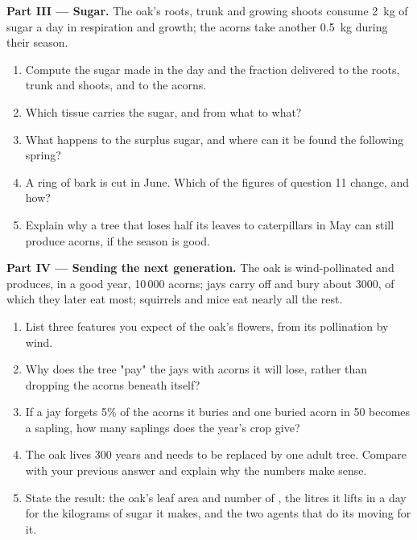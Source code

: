 \begin{problem}
\medskip
\noindent\textbf{Part III --- Sugar.}
The oak's roots, trunk and growing shoots consume \qty{2}{kg} of sugar
a day in respiration and growth; the acorns take another \qty{0.5}{kg}
during their season.
\begin{enumerate}[resume]
  \item Compute the sugar made in the day and the fraction delivered
        to the roots, trunk and shoots, and to the acorns.
  \item Which tissue carries the sugar, and from what to what?
  \item What happens to the surplus sugar, and where can it be found
        the following spring?
  \item A ring of bark is cut in June. Which of the figures of question
        11 change, and how?
  \item Explain why a tree that loses half its leaves to caterpillars
        in May can still produce acorns, if the season is good.
\end{enumerate}

\medskip
\noindent\textbf{Part IV --- Sending the next generation.}
The oak is wind-pollinated and produces, in a good year, 10\,000
acorns; jays carry off and bury about 3000, of which they later eat
most; squirrels and mice eat nearly all the rest.
\begin{enumerate}[resume]
  \item List three features you expect of the oak's flowers, from its
        pollination by wind.
  \item Why does the tree "pay" the jays with acorns it will lose,
        rather than dropping the acorns beneath itself?
  \item If a jay forgets 5\% of the acorns it buries and one buried
        acorn in 50 becomes a sapling, how many saplings does the
        year's crop give?
  \item The oak lives 300 years and needs to be replaced by one adult
        tree. Compare with your previous answer and explain why the
        numbers make sense.
  \item State the result: the oak's leaf area and number of ,
        the litres it lifts in a day for the kilograms of sugar it
        makes, and the two agents that do its moving for it.
\end{enumerate}
\end{problem}
